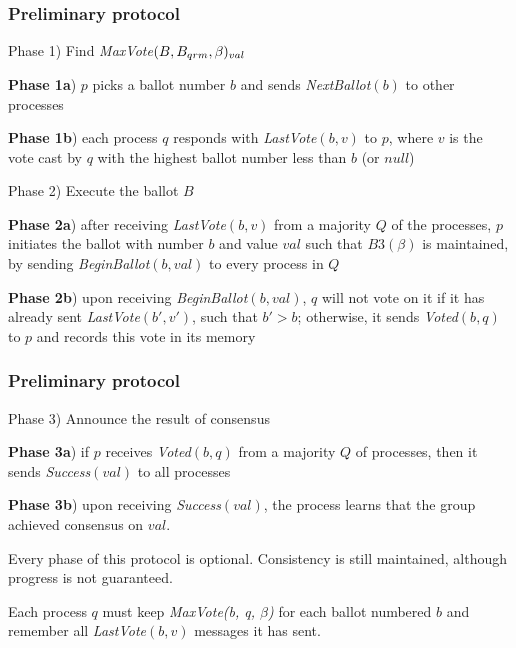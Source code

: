 \documentclass[10 pt]{beamer}
\begin{document}
\begin{frame}
\frametitle{Preliminary protocol}%

  Phase 1) Find \textit{MaxVote}$(B, B_{qrm}, \beta)_{val}$
   
  \pause
  \hspace{3 mm} \textbf{Phase 1a}) $p$ picks a ballot number $b$ and sends \textit{NextBallot}$(b)$ to other processes
  
  \pause 
  \hspace{3 mm} \textbf{Phase 1b}) each process $q$ responds with \textit{LastVote}$(b, v)$ to $p$, where $v$ is the vote cast by $q$ with the highest ballot number less than $b$ (or $null$)
   
  \vspace{6 mm}
  
  \pause 
  Phase 2) Execute the ballot $B$
  
  \pause 
  \hspace{3 mm} \textbf{Phase 2a}) after receiving \textit{LastVote}$(b, v)$ from a majority $Q$ of the processes, $p$ initiates the ballot with number $b$ and value $val$ such that $B3(\beta)$ is maintained, by sending \textit{BeginBallot}$(b, val)$ to every process in $Q$%
  
  \pause    
  \hspace{3 mm} \textbf{Phase 2b}) upon receiving \textit{BeginBallot}$(b, val)$, $q$ will not vote on it if it has already sent \textit{LastVote}$(b', v')$, such that $b' > b$; otherwise, it sends \textit{Voted}$(b, q)$ to $p$ and records this vote in its memory
  
\end{frame}



\begin{frame}
\frametitle{Preliminary protocol}
   
  Phase 3) Announce the result of consensus
  
  \pause 
  \hspace{3 mm} \textbf{Phase 3a}) if $p$ receives \textit{Voted}$(b, q)$ from a majority $Q$ of processes, then it sends \textit{Success}$(val)$ to all processes
  
  \pause    
  \hspace{3 mm} \textbf{Phase 3b}) upon receiving \textit{Success}$(val)$, the process learns that the group achieved consensus on $val$.
  
  \pause
  \vspace{6mm}
  Every phase of this protocol is optional. Consistency is still maintained, although progress is not guaranteed.

  \vspace{6mm}
  Each process $q$ must keep \textit{MaxVote(b, q, $\beta$)} for each ballot numbered $b$ and remember all \textit{LastVote}$(b, v)$ messages it has sent.
 
\end{frame}
\end{document}
